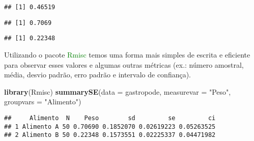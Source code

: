 \documentclass[14pt,titlepage, oneside, openany, a4paper]{book}
\newenvironment{Shaded}{\begin{snugshade}}{\end{snugshade}}
\newcommand{\DataTypeTok}[1]{\textcolor[rgb]{0.13,0.29,0.53}{#1}}
\newcommand{\KeywordTok}[1]{\textcolor[rgb]{0.13,0.29,0.53}{\textbf{#1}}}
\newcommand{\NormalTok}[1]{#1}
\newcommand{\OperatorTok}[1]{\textcolor[rgb]{0.81,0.36,0.00}{\textbf{#1}}}
\newcommand{\StringTok}[1]{\textcolor[rgb]{0.31,0.60,0.02}{#1}}
\begin{document}
\begin{Shaded}
\end{Shaded}

\begin{verbatim}
## [1] 0.46519
\end{verbatim}

\begin{Shaded}
\end{Shaded}

\begin{verbatim}
## [1] 0.7069
\end{verbatim}

\begin{Shaded}
\end{Shaded}

\begin{verbatim}
## [1] 0.22348
\end{verbatim}

Utilizando o pacote \textcolor{green}{Rmisc} temos uma forma mais simples de escrita e eficiente para observar esses valores e algumas outras métricas (ex.: número amostral, média, desvio padrão, erro padrão e intervalo de confiança).

\begin{Shaded}
\begin{Highlighting}[]
\KeywordTok{library}\NormalTok{(Rmisc)}
\KeywordTok{summarySE}\NormalTok{(}\DataTypeTok{data =}\NormalTok{ gastropode, }\DataTypeTok{measurevar =} \StringTok{"Peso"}\NormalTok{, }\DataTypeTok{groupvars =} \StringTok{"Alimento"}\NormalTok{)}
\end{Highlighting}
\end{Shaded}

\begin{verbatim}
##     Alimento  N    Peso        sd         se         ci
## 1 Alimento A 50 0.70690 0.1852070 0.02619223 0.05263525
## 2 Alimento B 50 0.22348 0.1573551 0.02225337 0.04471982
\end{verbatim}
\end{document}
